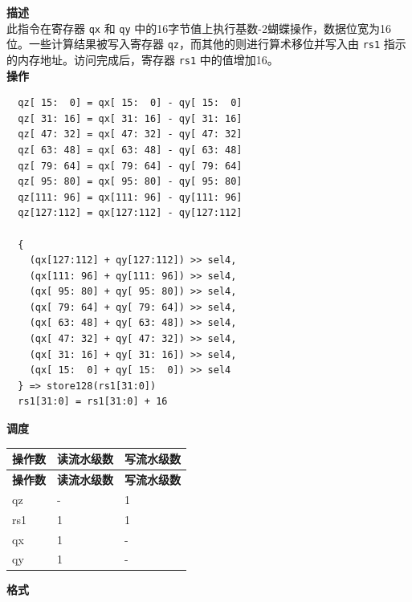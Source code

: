 \textbf{描述}\\
此指令在寄存器 \lstinline{qx} 和 \lstinline{qy} 中的16字节值上执行基数-2蝴蝶操作，数据位宽为16位。一些计算结果被写入寄存器 \lstinline{qz}，而其他的则进行算术移位并写入由 \lstinline{rs1} 指示的内存地址。访问完成后，寄存器 \lstinline{rs1} 中的值增加16。\\
\textbf{操作}
\begin{lstlisting}
  qz[ 15:  0] = qx[ 15:  0] - qy[ 15:  0]
  qz[ 31: 16] = qx[ 31: 16] - qy[ 31: 16]
  qz[ 47: 32] = qx[ 47: 32] - qy[ 47: 32]
  qz[ 63: 48] = qx[ 63: 48] - qy[ 63: 48]
  qz[ 79: 64] = qx[ 79: 64] - qy[ 79: 64]
  qz[ 95: 80] = qx[ 95: 80] - qy[ 95: 80]
  qz[111: 96] = qx[111: 96] - qy[111: 96]
  qz[127:112] = qx[127:112] - qy[127:112]

  {
    (qx[127:112] + qy[127:112]) >> sel4,
    (qx[111: 96] + qy[111: 96]) >> sel4,
    (qx[ 95: 80] + qy[ 95: 80]) >> sel4,
    (qx[ 79: 64] + qy[ 79: 64]) >> sel4,
    (qx[ 63: 48] + qy[ 63: 48]) >> sel4,
    (qx[ 47: 32] + qy[ 47: 32]) >> sel4,
    (qx[ 31: 16] + qy[ 31: 16]) >> sel4,
    (qx[ 15:  0] + qy[ 15:  0]) >> sel4
  } => store128(rs1[31:0])
  rs1[31:0] = rs1[31:0] + 16
\end{lstlisting}

\textbf{调度}\\
\begin{longtable}[c]{|l|l|l|}
    \hline
    \rowcolor{lightgray}
    \textbf{操作数} & \textbf{读流水级数} & \textbf{写流水级数} \\\hline
    \endfirsthead
    \hline
    \rowcolor{lightgray}
     \textbf{操作数} & \textbf{读流水级数} & \textbf{写流水级数} \\\hline
    \endhead
    \hline
    \endfoot

  qz & - & 1 \\\hline
  rs1 & 1 & 1 \\\hline
  qx & 1 & - \\\hline
  qy & 1 & -

\end{longtable}

\textbf{格式}\\

